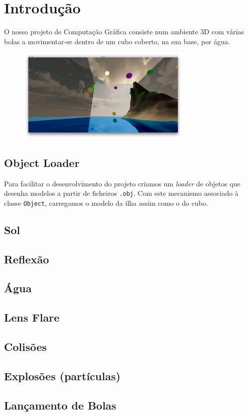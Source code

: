 \documentclass[12pt]{article}
\title{\TitleFont{Computação Gráfica}}
\author{David Gomes (2013136061) \and \vspace{-0.1cm} André Baptista (2013136742)}
\date{}
\begin{document}
\maketitle

\section*{Introdução}
O nosso projeto de Computação Gráfica consiste num ambiente 3D com várias bolas a movimentar-se
dentro de um cubo coberto, na sua base, por água.

\begin{figure}[H]
  \centering
  \includegraphics[width=0.75\textwidth]{screenshot}
\end{figure}

\pagebreak

\subsection*{Object Loader}
Para facilitar o desenvolvimento do projeto criamos um \textit{loader} de objetos que desenha modelos
a partir de ficheiros \texttt{.obj}. Com este mecanismo associado à classe \texttt{Object}, carregamos o modelo da ilha assim como o do cubo.
\subsection*{Sol}
\subsection*{Reflexão}
\subsection*{Água}
\subsection*{Lens Flare}
\subsection*{Colisões}
\subsection*{Explosões (partículas)}
\subsection*{Lançamento de Bolas}
\end{document}
